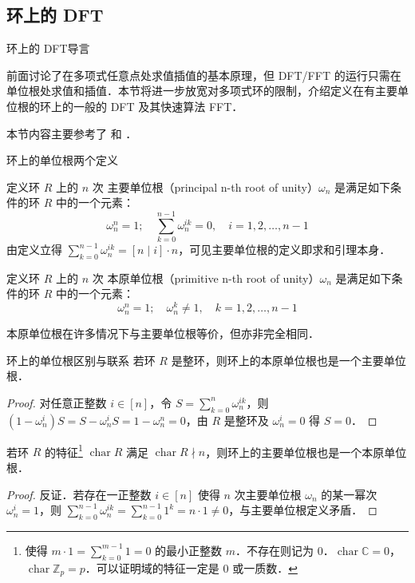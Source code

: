 \documentclass[fontset=fandol]{ctexbeamer}
\newcommand{\myemph}[1]{{\usebeamercolor[fg]{structure} #1}}
\DeclareMathOperator{\ringchar}{char}
\begin{document}
\subsection{环上的 DFT}

\begin{frame}{环上的 DFT}{导言}

    前面讨论了在多项式任意点处求值插值的基本原理，但 DFT/FFT 的运行只需在单位根处求值和插值．本节将进一步放宽对多项式环的限制，介绍定义在有主要单位根的环上的一般的 DFT 及其快速算法 FFT．

    本节内容主要参考了 \cite[section 2, The discrete Fourier transform (DFT), pp. 983--984]{furer2009faster} 和 \cite{wikipedia-dft-over-ring}．
\end{frame}

\begin{frame}{环上的单位根}{两个定义}

    定义环 $R$ 上的 $n$ 次\myemph{主要单位根}（principal n-th root of unity）$\omega_n$ 是满足如下条件的环 $R$ 中的一个元素：
    \[
        \omega_n^n = 1;\quad \sum_{k=0}^{n-1} \omega_n^{ik} = 0,\quad i=1,2,\dots,n-1
    \]
    由定义立得 $\sum_{k=0}^{n-1} \omega_n^{ik} = [n \mid i] \cdot 
    n$，可见主要单位根的定义即求和引理本身．
    
    定义环 $R$ 上的 $n$ 次\myemph{本原单位根}（primitive n-th root of unity）$\omega_n$ 是满足如下条件的环 $R$ 中的一个元素：
    \[
        \omega_n^n = 1;\quad \omega_n^k \neq 1,\quad k=1,2,\dots,n-1
    \]

    本原单位根在许多情况下与主要单位根等价，但亦非完全相同．
\end{frame}

\begin{frame}{环上的单位根}{区别与联系}
    若环 $R$ 是整环，则环上的本原单位根也是一个主要单位根．
    \begin{proof}
        对任意正整数 $i \in [n]$，令 $S = \sum_{k=0}^n \omega_n^{ik}$，则 $(1-\omega_n^i) S = S - \omega_n^i S = 1 - \omega_n^n = 0$，由 $R$ 是整环及 $\omega_n^i=0$ 得 $S=0$．
    \end{proof}

    若环 $R$ 的特征\footnote{使得 $m \cdot 1 = \sum_{k=0}^{m-1}1 = 0$ 的最小正整数 $m$．不存在则记为 $0$．$\ringchar \mathbb C = 0$，$\ringchar \mathbb Z_p = p$．可以证明域的特征一定是 $0$ 或一质数\cite[第 7 章第 11 节定理 3，p. 70]{qiu-algebra}．} $\ringchar R$ 满足 $\ringchar R \nmid n$，则环上的主要单位根也是一个本原单位根．
    \begin{proof}
        反证．若存在一正整数 $i \in [n]$ 使得 $n$ 次主要单位根 $\omega_n$ 的某一幂次 $\omega_n^i=1$，则 $\sum_{k=0}^{n-1} \omega_n^{ik} = \sum_{k=0}^{n-1} 1^k = n \cdot 1 \neq 0$，与主要单位根定义矛盾．
    \end{proof}
\end{frame}
\end{document}
